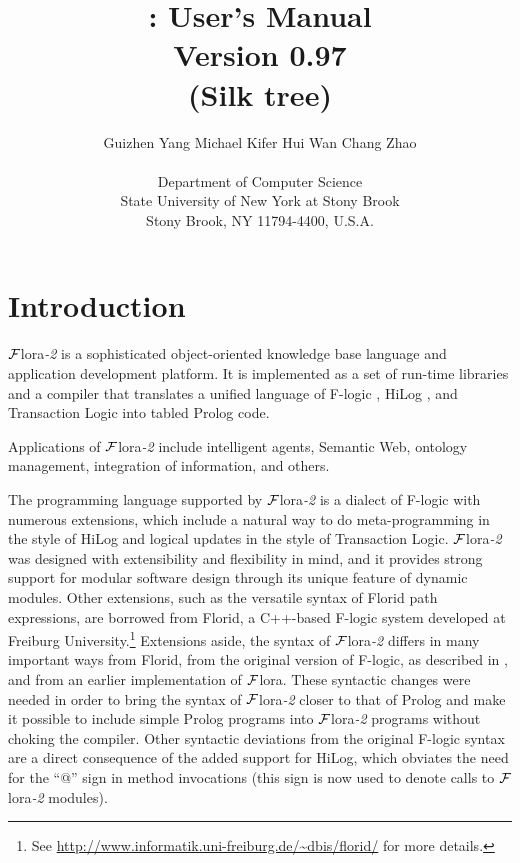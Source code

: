 \documentclass[11pt]{article}
\title{
        \FLORA: User's Manual
           \\
       {\Large Version 0.97}
       \vspace{-2mm}\\
       {\large (Silk tree)}
       }
\author{
  {Guizhen Yang
  \hspace{1cm}
  Michael Kifer
  \hspace{1cm}
  Hui Wan
  \hspace{1cm}
  Chang Zhao
}
  \\\\
  Department of Computer Science\\
  State University of New York at Stony Brook\\
  Stony Brook, NY 11794-4400, U.S.A.
  }
\newcommand{\FLORA}{{\mbox{\sc ${\cal F}${lora}\rm\emph{-2}}}\xspace}
\newcommand{\FLORAone}{{\mbox{${\cal F}${\sc lora}}}\xspace}
\newcommand{\FLORID}{{\mbox{\sc Florid}}\xspace}
\newcommand{\fl}{\mbox{F-logic}\xspace}
\begin{document}
\maketitle
\thispagestyle{empty}

\newpage
{}
\setcounter{page}{1}

\tableofcontents

\newpage

\setcounter{page}{1}


\section{Introduction}\label{sec-intro}

\FLORA is a sophisticated object-oriented knowledge base language and
application development platform. It is implemented as a set of run-time
libraries and a compiler that translates a unified language of \fl
\cite{KLW95}, HiLog \cite{hilog-jlp}, and Transaction Logic
\cite{trans-chapter-98,trans-tcs94} into tabled Prolog code.

Applications of \FLORA include intelligent agents, Semantic Web, ontology
management, integration of information, and others. 

The programming language supported by \FLORA is a dialect of \fl with
numerous extensions, which include a natural way to do meta-programming in
the style of HiLog and logical updates in the style of Transaction
Logic. \FLORA was designed with extensibility and flexibility in mind, and
it provides strong support for modular software design through its unique
feature of dynamic modules.
Other extensions, such as the versatile syntax of \FLORID path
expressions, are borrowed from
\FLORID, a C++-based \fl system developed at
Freiburg University.\footnote{
  See \url{http://www.informatik.uni-freiburg.de/~dbis/florid/} for more
  details.
}
Extensions aside, the syntax of \FLORA differs in many
important ways from \FLORID, from the original version of \fl, as described
in \cite{KLW95}, and from an earlier implementation of \FLORAone. These
syntactic changes were needed in order to bring the syntax of \FLORA closer
to that of Prolog and make it possible to include simple Prolog programs
into \FLORA programs without choking the compiler.  Other syntactic
deviations from the original F-logic syntax are a direct consequence of the
added support for HiLog, which obviates the need for the ``@'' sign in
method invocations (this sign is now used to denote calls to \FLORA
modules).
\end{document}
